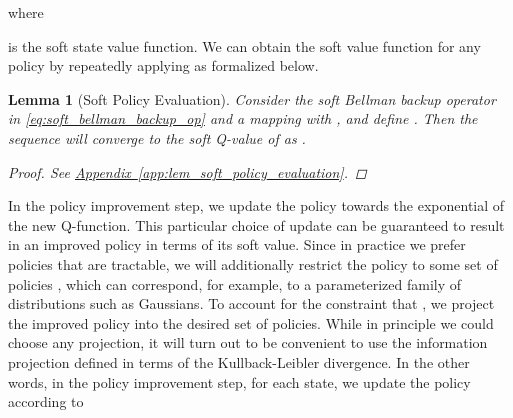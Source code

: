 \documentclass{article}
\newtheorem{lemma}{Lemma}
\newcommand{\aref}[1]{\hyperref[#1]{Appendix~\ref*{#1}}}
\begin{document}
where

is the soft state value function. We can obtain the soft value function for any policy  by repeatedly applying  as formalized below.
\begin{lemma}[Soft Policy Evaluation]
\label{lem:soft_policy_evaluation}
Consider the soft Bellman backup operator  in \autoref{eq:soft_bellman_backup_op} and a mapping  with , and define . Then the sequence  will converge to the soft Q-value of  as .
\begin{proof}
See \aref{app:lem_soft_policy_evaluation}.
\end{proof}
\end{lemma}
In the policy improvement step, we update the policy towards the exponential of the new Q-function. This particular choice of update can be guaranteed to result in an improved policy in terms of its soft value.
Since in practice we prefer policies that are tractable, we will additionally restrict the policy to some set of policies , which can correspond, for example, to a parameterized family of distributions such as Gaussians. 
To account for the constraint that , we project the improved policy into the desired set of policies. While in principle we could choose any projection, it will turn out to be convenient to use the information projection defined in terms of the Kullback-Leibler divergence. In the other words, in the policy improvement step, for each state, we update the policy according to
\end{document}
